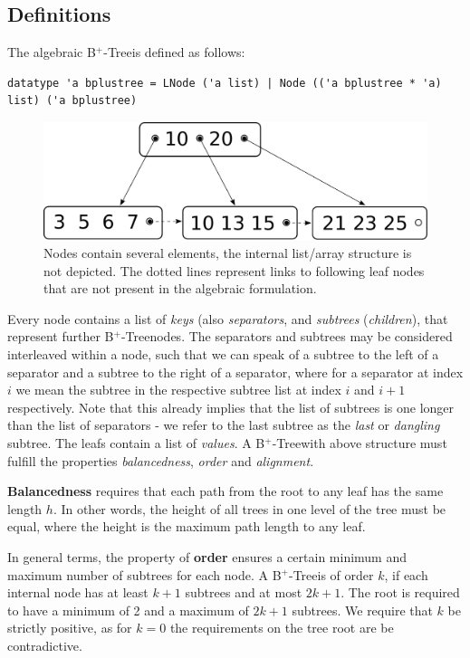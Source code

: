 \documentclass[a4paper,UKenglish,cleveref, autoref, thm-restate]{lipics-v2021}
\newcommand{\btree}{B$^+$-Tree}
\begin{document}
\subsection{Definitions}
\label{sec:data_structure_defs}


The algebraic \btree is defined as follows:

\begin{lstlisting}[mathescape=true, language=Isabelle,label=lst:btree-def]
    datatype 'a bplustree = LNode ('a list) | Node (('a bplustree * 'a) list) ('a bplustree)
\end{lstlisting}


\begin{figure}
    \centering
    \includegraphics[width=0.5\linewidth]{btree-basic-nopair.pdf}
    \caption[Visualization of a \btree]
    {Nodes contain several elements, the internal list/array structure is not depicted.
    The dotted lines represent links to following leaf nodes that are not present in the algebraic formulation.}
    \label{fig:btree-basic}
\end{figure}


Every node contains a list of \textit{keys} (also \textit{separators}, and \textit{subtrees} (\textit{children}),
that represent further \btree nodes.
The separators and subtrees may be considered interleaved within a node,
such that we can speak of a subtree to the left of a separator and
a subtree to the right of a separator,
where for a separator at index $i$ we mean the subtree in the respective
subtree list at index $i$ and $i+1$ respectively.
Note that this already implies that the list of subtrees is one
longer than the list of separators - we refer to the last subtree
as the \textit{last} or \textit{dangling} subtree.
The leafs contain a list of \textit{values}.
A \btree with above structure must fulfill the properties
\textit{balancedness}, \textit{order} and \textit{alignment}.

\textbf{Balancedness} requires
that each path from the root to any leaf has the same length $h$.
In other words, the height of all trees in one level of the tree must be equal,
where the height is the maximum path length to any leaf.

In general terms, the property of \textbf{order} ensures a certain minimum and maximum
number of subtrees for each node.
A \btree is of order $k$, if each internal node has at least $k+1$
subtrees and at most $2k+1$.
The root is required to have a minimum of 2 and a maximum of $2k+1$ subtrees.
We require that $k$ be strictly positive, as for $k = 0$ the requirements on the tree
root are be contradictive.
\end{document}
